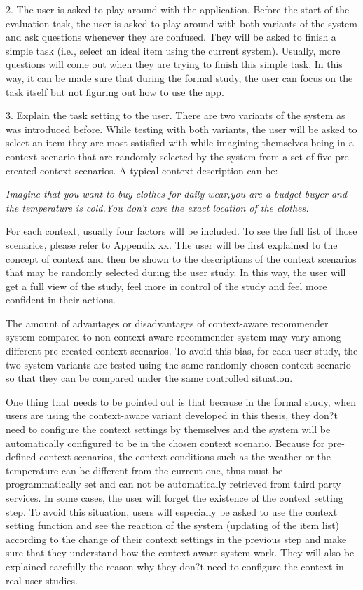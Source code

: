2. The user is asked to play around with the application.
Before the start of the evaluation task, the user is asked to play around with both variants of the system and ask questions whenever they are confused. They will be asked to finish a simple task (i.e., select an ideal item using the current system). Usually, more questions will come out when they are trying to finish this simple task. In this way, it can be made sure that during the formal study, the user can focus on the task itself but not figuring out how to use the app.

3. Explain the task setting to the user.
There are two variants of the system as was introduced before. While testing with both variants, the user will be asked to select an item they are most satisfied with while imagining themselves being in a context scenario that are randomly selected by the system from a set of five pre-created context scenarios. A typical context description can be:

\textit{Imagine that you want to buy clothes for daily wear,you are a budget buyer and the temperature is cold.You don't care the exact location of the clothes.}

For each context, usually four factors will be included. To see the full list of those scenarios, please refer to Appendix xx. The user will be first explained to the concept of context and then be shown to the descriptions of the context scenarios that may be randomly selected during the user study. In this way, the user will get a full view of the study, feel more in control of the study and feel more confident in their actions.

The amount of advantages or disadvantages of context-aware recommender system compared to non context-aware recommender system may vary among different pre-created context scenarios. To avoid this bias, for each user study, the two system variants are tested using the same randomly chosen context scenario so that they can be compared under the same controlled situation. 

One thing that needs to be pointed out is that because in the formal study, when users are using the context-aware variant developed in this thesis, they don?t need to configure the context settings by themselves and the system will be automatically configured to be in the chosen context scenario. Because for pre-defined context scenarios, the context conditions such as the weather or the temperature can be different from the current one, thus must be programmatically set and can not be automatically retrieved from third party services. In some cases, the user will forget the existence of the context setting step. To avoid this situation, users will especially be asked to use the context setting function and see the reaction of the system (updating of the item list) according to the change of their context settings in the previous step and make sure that they understand how the context-aware system work. They will also be explained carefully the reason why they don?t need to configure the context in real user studies.

